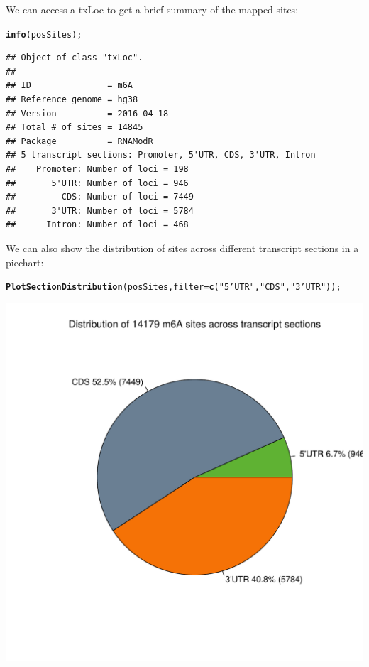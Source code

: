 \documentclass[a4paper,11pt]{article}\usepackage[]{graphicx}\usepackage[]{color}
\makeatletter
\def\maxwidth{ %
  \ifdim\Gin@nat@width>\linewidth
    \linewidth
  \else
    \Gin@nat@width
  \fi
}
\newcommand{\hlstr}[1]{\textcolor[rgb]{0.192,0.494,0.8}{#1}}%
\newcommand{\hlstd}[1]{\textcolor[rgb]{0.345,0.345,0.345}{#1}}%
\newcommand{\hlkwc}[1]{\textcolor[rgb]{0.333,0.667,0.333}{#1}}%
\newcommand{\hlkwd}[1]{\textcolor[rgb]{0.737,0.353,0.396}{\textbf{#1}}}%
\newenvironment{kframe}{%
 \def\at@end@of@kframe{}%
 \ifinner\ifhmode%
  \def\at@end@of@kframe{\end{minipage}}%
  \begin{minipage}{\columnwidth}%
 \fi\fi%
 \def\FrameCommand##1{\hskip\@totalleftmargin \hskip-\fboxsep
 \colorbox{shadecolor}{##1}\hskip-\fboxsep
     \hskip-\linewidth \hskip-\@totalleftmargin \hskip\columnwidth}%
 \MakeFramed {\advance\hsize-\width
   \@totalleftmargin\z@ \linewidth\hsize
   \@setminipage}}%
 {\par\unskip\endMakeFramed%
 \at@end@of@kframe}
\newenvironment{knitrout}{}{} %
\makeatother
\begin{document}
We can access a txLoc to get a brief summary of the mapped sites:
\begin{knitrout}
\color{fgcolor}\begin{kframe}
\begin{alltt}
\hlkwd{info}\hlstd{(posSites);}
\end{alltt}
\begin{verbatim}
## Object of class "txLoc".
## 
## ID               = m6A
## Reference genome = hg38
## Version          = 2016-04-18
## Total # of sites = 14845
## Package          = RNAModR
## 5 transcript sections: Promoter, 5'UTR, CDS, 3'UTR, Intron
##    Promoter: Number of loci = 198
##       5'UTR: Number of loci = 946
##         CDS: Number of loci = 7449
##       3'UTR: Number of loci = 5784
##      Intron: Number of loci = 468
\end{verbatim}
\end{kframe}
\end{knitrout}

We can also show the distribution of sites across different transcript sections in a piechart:
\begin{knitrout}
\color{fgcolor}\begin{kframe}
\begin{alltt}
\hlkwd{PlotSectionDistribution}\hlstd{(posSites,} \hlkwc{filter} \hlstd{=} \hlkwd{c}\hlstd{(}\hlstr{"5'UTR"}\hlstd{,} \hlstr{"CDS"}\hlstd{,} \hlstr{"3'UTR"}\hlstd{));}
\end{alltt}
\end{kframe}
\includegraphics[width=\maxwidth]{figure/unnamed-chunk-7-1} 

\end{knitrout}
\end{document}
